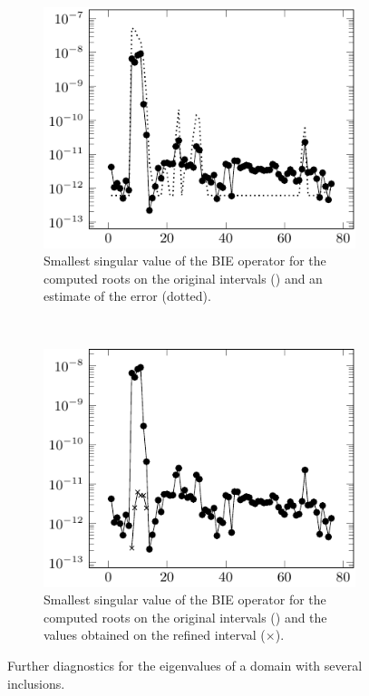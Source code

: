 %

\begin{figure}
  \centering
  \begin{subfigure}[t]{0.4\textwidth}
    \centering
    \includegraphics[width=\textwidth]{ex_many_holes_004_sings_plot_west}
    \caption{Smallest singular value of the BIE operator
      for the computed roots on the original intervals (\textbullet)
      and an estimate of the error (dotted).}
    \label{subfig:many_inclusions_sings_west}
  \end{subfigure}
  ~
  \begin{subfigure}[t]{0.4\textwidth}
    \centering
    \includegraphics[width=\textwidth]{ex_many_holes_004_sings_plot_ref}
    \caption{Smallest singular value of the BIE operator
      for the computed roots on the original intervals (\textbullet)
      and the values obtained on the refined interval ($\times$).}
    \label{subfig:many_inclusions_sings_ref}
  \end{subfigure}
  \caption{Further diagnostics for the eigenvalues of a domain
    with several inclusions.}
  \label{fig:many_inclusions_diagnostics_2}
\end{figure}

